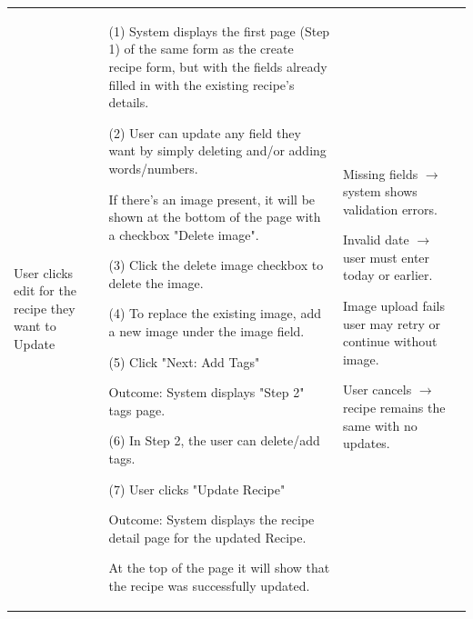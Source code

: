\documentclass[10pt,a4paper]{article}
\begin{document}
\begin{longtable}{|p{30mm}|p{30mm}|p{40mm}|p{40mm}|}
User clicks edit for the recipe they want to Update
&
(1) System displays the first page (Step 1) of the same form as the create recipe form,
but with the fields already filled in with the existing recipe's details.

\vspace{1 mm}

(2) User can update any field they want by simply deleting and/or adding words/numbers.

If there's an image present, it will be shown at the bottom of the page with a checkbox "Delete image".

\vspace{1 mm}

(3) Click the delete image checkbox to delete the image.

\vspace{1 mm}

(4) To replace the existing image, add a new image under the image field.

\vspace{1 mm}

(5) Click "Next: Add Tags"

Outcome: System displays "Step 2" tags page.

\vspace{1 mm}

(6) In Step 2, the user can delete/add tags.

\vspace{1 mm}

(7) User clicks "Update Recipe"

Outcome: System displays the recipe detail page for the updated Recipe.

At the top of the page it will show that the recipe was successfully updated.
&
Missing fields $\rightarrow$ system shows validation errors.

\vspace{1 mm}

Invalid date $\rightarrow$  user must enter today or earlier.

\vspace{1 mm}

Image upload fails user may retry or continue without image.

\vspace{1 mm}

User cancels $\rightarrow$  recipe remains the same with no updates. \\






\end{longtable}
\end{document}

